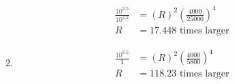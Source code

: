 \documentclass{article}
\begin{document}
\begin{enumerate}
\begin{enumerate}
        \begin{align*}
            \frac{10^{3.5}}{10^{4.2}} &= (R)^2(\frac{4000}{25000})^4\\
            R &= 17.448 \text{ times larger}
        \end{align*}
        
        \item
        
        \begin{align*}
            \frac{10^{3.5}}{1} &= (R)^2(\frac{4000}{5800})^4\\
            R &= 118.23\text{ times larger}
        \end{align*}
        
    \end{enumerate}
    
\end{enumerate}
\end{document}
